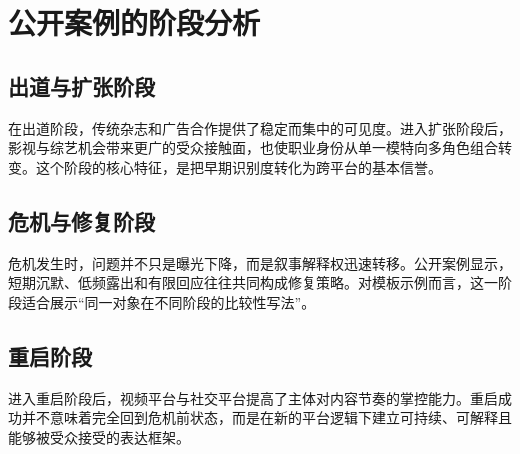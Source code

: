\chapter{公开案例的阶段分析}

\section{出道与扩张阶段}

在出道阶段，传统杂志和广告合作提供了稳定而集中的可见度。进入扩张阶段后，影视与综艺机会带来更广的受众接触面，也使职业身份从单一模特向多角色组合转变。这个阶段的核心特征，是把早期识别度转化为跨平台的基本信誉\cite{senft}。

\section{危机与修复阶段}

危机发生时，问题并不只是曝光下降，而是叙事解释权迅速转移。公开案例显示，短期沉默、低频露出和有限回应往往共同构成修复策略。对模板示例而言，这一阶段适合展示“同一对象在不同阶段的比较性写法”\cite{hills}。

\section{重启阶段}

进入重启阶段后，视频平台与社交平台提高了主体对内容节奏的掌控能力。重启成功并不意味着完全回到危机前状态，而是在新的平台逻辑下建立可持续、可解释且能够被受众接受的表达框架\cite{Couldry}。
